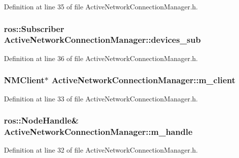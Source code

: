 \-Definition at line 35 of file \-Active\-Network\-Connection\-Manager.\-h.

\subsubsection[{devices\-\_\-sub}]{\setlength{\rightskip}{0pt plus 5cm}ros\-::\-Subscriber {\bf \-Active\-Network\-Connection\-Manager\-::devices\-\_\-sub}\hspace{0.3cm}{\ttfamily  [private]}}\label{classActiveNetworkConnectionManager_a6a01f6004280e0729aee9c148736df82}


\-Definition at line 36 of file \-Active\-Network\-Connection\-Manager.\-h.

\subsubsection[{m\-\_\-client}]{\setlength{\rightskip}{0pt plus 5cm}\-N\-M\-Client$\ast$ {\bf \-Active\-Network\-Connection\-Manager\-::m\-\_\-client}\hspace{0.3cm}{\ttfamily  [private]}}\label{classActiveNetworkConnectionManager_ac396aa42342a745abd73942326046aaa}


\-Definition at line 33 of file \-Active\-Network\-Connection\-Manager.\-h.

\subsubsection[{m\-\_\-handle}]{\setlength{\rightskip}{0pt plus 5cm}ros\-::\-Node\-Handle\& {\bf \-Active\-Network\-Connection\-Manager\-::m\-\_\-handle}\hspace{0.3cm}{\ttfamily  [private]}}\label{classActiveNetworkConnectionManager_a0a973ef85d741b93370605198eb008bf}


\-Definition at line 32 of file \-Active\-Network\-Connection\-Manager.\-h.

